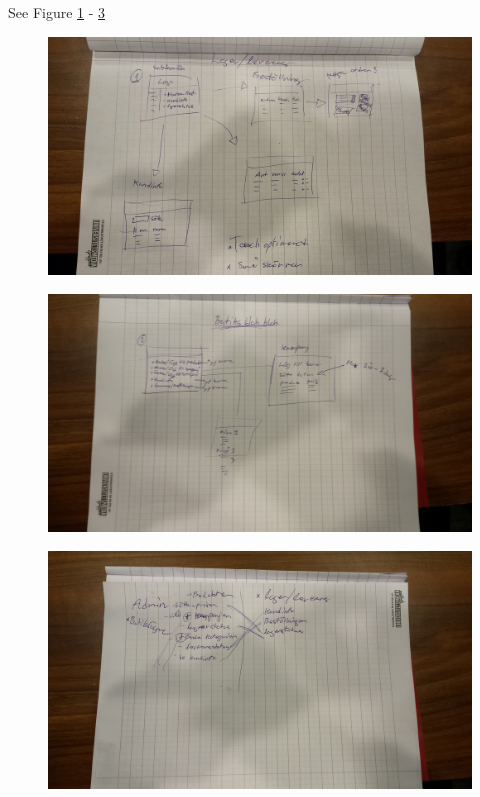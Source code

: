 \documentclass[paper=a4, fontsize=11pt]{report} %
\begin{document}
	See Figure \ref{fig:2} - \ref{fig:4}

	\begin{figure}
		\includegraphics[scale=0.12]{artifacts/Lager.jpeg}
		\caption{}
		\label{fig:2}
	\end{figure}

	\begin{figure}
		\includegraphics[scale=0.12]{artifacts/ButiksAdmin.jpeg}
		\caption{}
		\label{fig:3}
	\end{figure}

	\begin{figure}
		\includegraphics[scale=0.12]{artifacts/Admin.jpeg}
		\caption{}
		\label{fig:4}
	\end{figure}
\end{document}
